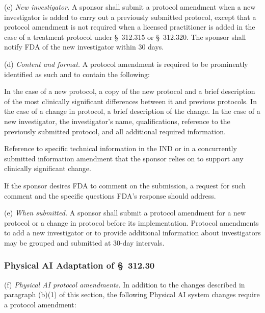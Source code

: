 (c) \textit{New investigator.} A sponsor shall submit a protocol amendment when a new investigator is added to carry out a previously submitted protocol, except that a protocol amendment is not required when a licensed practitioner is added in the case of a treatment protocol under \S~312.315 or \S~312.320. The sponsor shall notify FDA of the new investigator within 30 days.

(d) \textit{Content and format.} A protocol amendment is required to be prominently identified as such and to contain the following:

\begin{description}[leftmargin=0.5cm,style=sameline]
\item[(1)] In the case of a new protocol, a copy of the new protocol and a brief description of the most clinically significant differences between it and previous protocols. In the case of a change in protocol, a brief description of the change. In the case of a new investigator, the investigator's name, qualifications, reference to the previously submitted protocol, and all additional required information.
\item[(2)] Reference to specific technical information in the IND or in a concurrently submitted information amendment that the sponsor relies on to support any clinically significant change.
\item[(3)] If the sponsor desires FDA to comment on the submission, a request for such comment and the specific questions FDA's response should address.
\end{description}

(e) \textit{When submitted.} A sponsor shall submit a protocol amendment for a new protocol or a change in protocol before its implementation. Protocol amendments to add a new investigator or to provide additional information about investigators may be grouped and submitted at 30-day intervals.

\subsubsection{Physical AI Adaptation of \S~312.30}

(f) \textit{Physical AI protocol amendments.} In addition to the changes described in paragraph (b)(1) of this section, the following Physical AI system changes require a protocol amendment:


